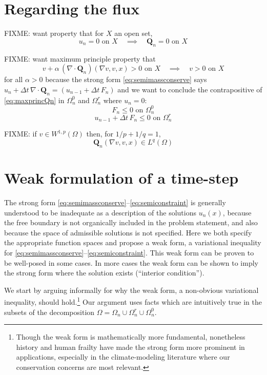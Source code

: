 \documentclass[final,leqno,onefignum,onetabnum]{siamltex1213bueler}
\newcommand\bQ{\mathbf{Q}}
\newcommand{\Div}{\nabla\cdot}
\renewcommand{\grad}{\nabla}
\begin{document}
\section{Regarding the flux} \label{sec:fluxassumptions}

FIXME:  want property that for $X$ an open set,
\begin{equation}
u_n=0 \text{ on } X \quad \implies \quad \bQ_n=0 \text{ on } X  \label{eq:vanishingQn}
\end{equation}

FIXME:  want maximum principle property that
\begin{equation}
v + \alpha\, (\Div \bQ_n)(\grad v,v,x) > 0 \text{ on } X \quad \implies \quad v > 0 \text{ on } X  \label{eq:maxprincQn}
\end{equation}
for all $\alpha>0$ because the strong form \eqref{eq:semimassconserve} says $u_n + \Delta t\, \Div \bQ_n = (u_{n-1} + \Delta t\, F_n)$ and we want to conclude the contrapositive of \eqref{eq:maxprincQn} in $\Omega_n^0$ and $\Omega_n^r$ where $u_n=0$:
\begin{equation}
F_n \le 0  \text{ on } \Omega_n^0  \label{eq:inequalityonzero}
\end{equation}
\begin{equation}
u_{n-1} + \Delta t\, F_n \le 0  \text{ on } \Omega_n^r  \label{eq:inequalityonretreat}
\end{equation}

FIXME: if $v \in W^{1,p}(\Omega)$ then, for $1/p + 1/q = 1$,
    $$\bQ_n(\grad v,v,x) \in L^q(\Omega)$$ 

\section{Weak formulation of a time-step}  The strong form \eqref{eq:semimassconserve}--\eqref{eq:semiconstraint} is generally understood to be inadequate as a description of the solutions $u_n(x)$, because the free boundary is not organically included in the problem statement, and also because the space of admissible solutions is not specified.  Here we both specify the appropriate function spaces and propose a weak form, a variational inequality \cite{Friedman,KinderlehrerStampacchia} for \eqref{eq:semimassconserve}--\eqref{eq:semiconstraint}.  This weak form can be proven to be well-posed in some cases.  In more cases the weak form can be shown to imply the strong form where the solution exists (``interior condition'').

We start by arguing informally for why the weak form, a non-obvious variational inequality, should hold.\footnote{Though the weak form is mathematically more fundamental, nonetheless history and human frailty have made the strong form more prominent in applications, especially in the climate-modeling literature where our conservation concerns are most relevant.}  Our argument uses facts which are intuitively true in the subsets of the decomposition $\Omega = \Omega_n \cup \Omega_n^r \cup \Omega_n^0$.
\end{document}
